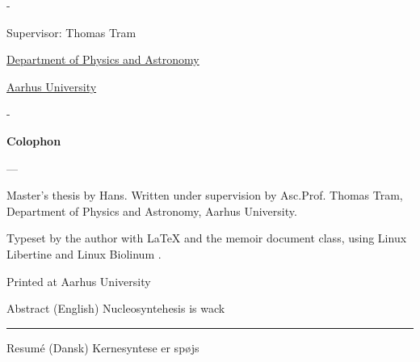 \begin{titlingpage}
\begin{adjustwidth*}{\frontpagecorrection-2cm}{-\frontpagecorrection-2cm}
    \bigskip

    \fontsize{14pt}{18pt}\selectfont
    \par
    \par

    \vfill

    Supervisor: Thomas Tram \par

    \vfill

    \fontsize{12pt}{14.5pt}\selectfont
    \href{https://www.phys.au.dk/}{Department of Physics and Astronomy}\par
    \href{https://www.au.dk/}{Aarhus University}

  \end{adjustwidth*}

  \newpage
  \begin{adjustwidth*}{\frontpagecorrection}{-\frontpagecorrection}
    \thispagestyle{empty}
    \strut\vfill
    {
      \setlength{\parindent}{0pt}
      \addtolength{\parskip}{.6em}

      \begin{center}
        \bfseries\sffamily Colophon
      \end{center}

      \small

      \textsl{\projecttitle}

      {--- \textsl{\projecttitledanish}}

      \smallskip

      Master's thesis by Hans. Written under supervision by Asc.Prof. Thomas Tram,
      Department of Physics and Astronomy, Aarhus University.

      Typeset by the author with \LaTeX{} and the \textsf{memoir} document class,
      using Linux Libertine and Linux Biolinum {\fontandleading}.

      Printed at Aarhus University
    }
  \end{adjustwidth*}
\end{titlingpage}


\thispagestyle{chapter}

\begin{multiabstract}{Abstract (English)} 
\noindent Nucleosyntehesis is wack

\end{multiabstract}


\plainbreak{2}

\begin{multiabstract}{Resumé (Dansk)}
\noindent Kernesyntese er spøjs

\end{multiabstract}

